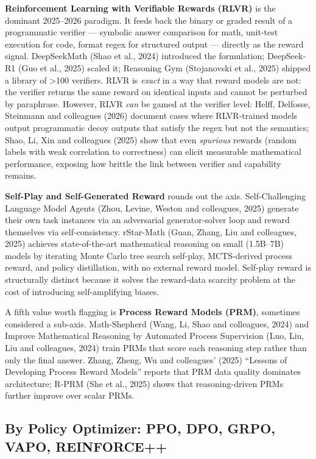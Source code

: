 \textbf{Reinforcement Learning with Verifiable Rewards (RLVR)} is the dominant 2025--2026 paradigm. It feeds back the binary or graded result of a programmatic verifier --- symbolic answer comparison for math, unit-test execution for code, format regex for structured output --- directly as the reward signal. DeepSeekMath (Shao et al., 2024) introduced the formulation; DeepSeek-R1 (Guo et al., 2025) scaled it; Reasoning Gym (Stojanovski et al., 2025) shipped a library of \textgreater100 verifiers. RLVR is \emph{exact} in a way that reward models are not: the verifier returns the same reward on identical inputs and cannot be perturbed by paraphrase. However, RLVR \emph{can} be gamed at the verifier level: Helff, Delfosse, Steinmann and colleagues (2026) document cases where RLVR-trained models output programmatic decoy outputs that satisfy the regex but not the semantics; Shao, Li, Xin and colleagues (2025) show that even \emph{spurious} rewards (random labels with weak correlation to correctness) can elicit measurable mathematical performance, exposing how brittle the link between verifier and capability remains.

\textbf{Self-Play and Self-Generated Reward} rounds out the axis. Self-Challenging Language Model Agents (Zhou, Levine, Weston and colleagues, 2025) generate their own task instances via an adversarial generator-solver loop and reward themselves via self-consistency. rStar-Math (Guan, Zhang, Liu and colleagues, 2025) achieves state-of-the-art mathematical reasoning on small (1.5B--7B) models by iterating Monte Carlo tree search self-play, MCTS-derived process reward, and policy distillation, with no external reward model. Self-play reward is structurally distinct because it solves the reward-data scarcity problem at the cost of introducing self-amplifying biases.

A fifth value worth flagging is \textbf{Process Reward Models (PRM)}, sometimes considered a sub-axis. Math-Shepherd (Wang, Li, Shao and colleagues, 2024) and Improve Mathematical Reasoning by Automated Process Supervision (Luo, Liu, Liu and colleagues, 2024) train PRMs that score each reasoning step rather than only the final answer. Zhang, Zheng, Wu and colleagues' (2025) ``Lessons of Developing Process Reward Models'' reports that PRM data quality dominates architecture; R-PRM (She et al., 2025) shows that reasoning-driven PRMs further improve over scalar PRMs.

\subsection{By Policy Optimizer: PPO, DPO, GRPO, VAPO, REINFORCE++}\label{by-policy-optimizer-ppo-dpo-grpo-vapo-reinforce}

